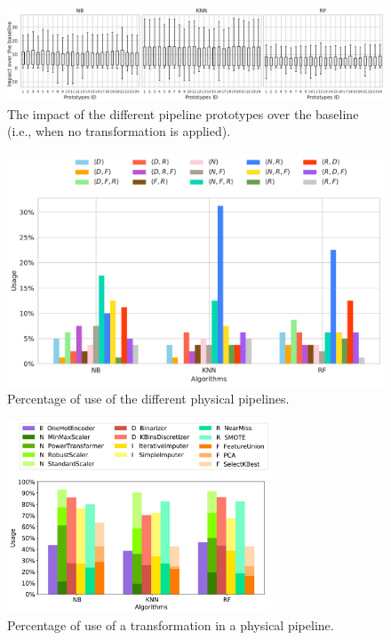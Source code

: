 \begin{figure}[!t]
	\centering
	\includegraphics[width=1.0\textwidth]{chapters/data-centric/supervised/img/prototypes_impact.pdf}
	\caption{The impact of the different pipeline prototypes over the baseline (i.e., when no transformation is applied).}
	\label{effective-fig:prototypes-impact}
\end{figure}

\begin{figure}[!h]
	\centering
	\includegraphics[width=1.0\textwidth]{chapters/data-centric/supervised/img/pp_pipeline_study2.pdf}
	\caption{Percentage of use of the different physical pipelines.}
	\label{effective-fig:pipeline-frequency}
\end{figure}

\begin{figure}[!h]
	\centering
	\includegraphics[width=0.7\textwidth]{chapters/data-centric/supervised/img/pp_pipeline_study_grouped.pdf}
	\caption{Percentage of use of a transformation in a physical pipeline.}
	\label{effective-fig:transformation-frequency}
\end{figure}


